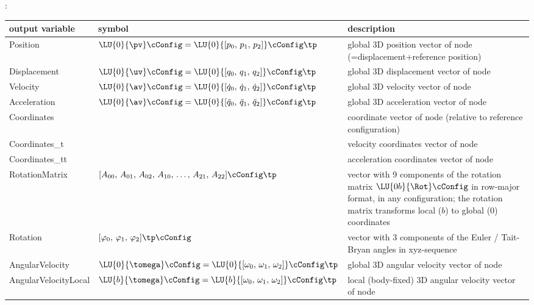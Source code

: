 :
\begin{center}
\footnotesize
\begin{longtable}{| p{5cm} | p{5cm} | p{6cm} |} 
\hline
\bf output variable & \bf symbol & \bf description \\ \hline
Position & $\LU{0}{\pv}\cConfig = \LU{0}{[p_0,\, p_1,\, p_2]}\cConfig\tp$ & global 3D position vector of node (=displacement+reference position)\\ \hline
Displacement & $\LU{0}{\uv}\cConfig = \LU{0}{[q_0,\, q_1,\, q_2]}\cConfig\tp$ & global 3D displacement vector of node\\ \hline
Velocity & $\LU{0}{\av}\cConfig = \LU{0}{[\dot q_0,\,\dot q_1,\,\dot q_2]}\cConfig\tp$ & global 3D velocity vector of node\\ \hline
Acceleration & $\LU{0}{\av}\cConfig = \LU{0}{[\ddot q_0,\,\ddot q_1,\,\ddot q_2]}\cConfig\tp$ & global 3D acceleration vector of node\\ \hline
Coordinates &  & coordinate vector of node (relative to reference configuration)\\ \hline
Coordinates\_t &  & velocity coordinates vector of node\\ \hline
Coordinates\_tt &  & acceleration coordinates vector of node\\ \hline
RotationMatrix & $[A_{00},\,A_{01},\,A_{02},\,A_{10},\,\ldots,\,A_{21},\,A_{22}]\cConfig\tp$ & vector with 9 components of the rotation matrix $\LU{0b}{\Rot}\cConfig$ in row-major format, in any configuration; the rotation matrix transforms local ($b$) to global (0) coordinates\\ \hline
Rotation & $[\varphi_0,\,\varphi_1,\,\varphi_2]\tp\cConfig$ & vector with 3 components of the Euler / Tait-Bryan angles in xyz-sequence\\ \hline
AngularVelocity & $\LU{0}{\tomega}\cConfig = \LU{0}{[\omega_0,\,\omega_1,\,\omega_2]}\cConfig\tp$ & global 3D angular velocity vector of node\\ \hline
AngularVelocityLocal & $\LU{b}{\tomega}\cConfig = \LU{b}{[\omega_0,\,\omega_1,\,\omega_2]}\cConfig\tp$ & local (body-fixed)  3D angular velocity vector of node\\ \hline
\end{longtable}
\end{center}
\newpage


